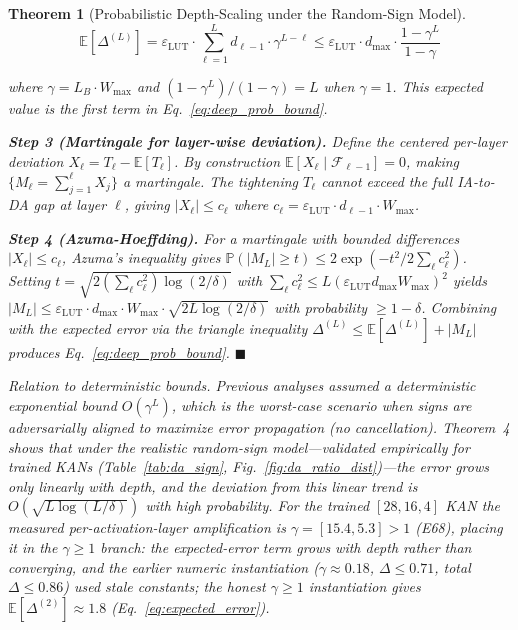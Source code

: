 \documentclass[journal,onecolumn]{IEEEtran}
\newtheorem{theorem}{Theorem}
\begin{document}
\begin{theorem}[Probabilistic Depth-Scaling under the Random-Sign Model]
\begin{equation}
\mathbb{E}[\Delta^{(L)}] = \varepsilon_{\text{LUT}} \cdot
\sum_{\ell=1}^L d_{\ell-1} \cdot \gamma^{L-\ell}
\leq \varepsilon_{\text{LUT}} \cdot d_{\max} \cdot
\frac{1 - \gamma^L}{1 - \gamma}
\label{eq:expected_error}
\end{equation}

where $\gamma = L_B \cdot W_{\max}$ and $(1-\gamma^L)/(1-\gamma) = L$
when $\gamma = 1$. This expected value is the first term in
Eq.~\ref{eq:deep_prob_bound}.

\vspace{2pt}
\noindent\textbf{Step 3 (Martingale for layer-wise deviation).}
Define the centered per-layer deviation
$X_\ell = T_\ell - \mathbb{E}[T_\ell]$. By construction
$\mathbb{E}[X_\ell \mid \mathcal{F}_{\ell-1}] = 0$, making
$\{M_\ell = \sum_{j=1}^\ell X_j\}$ a martingale. The tightening
$T_\ell$ cannot exceed the full IA-to-DA gap at layer $\ell$, giving
$|X_\ell| \leq c_\ell$ where
$c_\ell = \varepsilon_{\text{LUT}} \cdot d_{\ell-1} \cdot W_{\max}$.

\vspace{2pt}
\noindent\textbf{Step 4 (Azuma-Hoeffding).}
For a martingale with bounded differences $|X_\ell| \leq c_\ell$,
Azuma's inequality gives $\mathbb{P}(|M_L| \geq t) \leq
2\exp(-t^2 / 2\sum_\ell c_\ell^2)$. Setting
$t = \sqrt{2(\sum_\ell c_\ell^2) \log(2/\delta)}$ with
$\sum_\ell c_\ell^2 \leq L (\varepsilon_{\text{LUT}} d_{\max} W_{\max})^2$
yields $|M_L| \leq \varepsilon_{\text{LUT}} \cdot d_{\max} \cdot
W_{\max} \cdot \sqrt{2L \log(2/\delta)}$ with probability $\geq
1-\delta$. Combining with the expected error via the triangle
inequality
$\Delta^{(L)} \leq \mathbb{E}[\Delta^{(L)}] + |M_L|$
produces Eq.~\ref{eq:deep_prob_bound}. \hfill $\blacksquare$

\vspace{4pt}
\noindent\textit{Relation to deterministic bounds.}
Previous analyses assumed a deterministic exponential bound
$O(\gamma^L)$, which is the worst-case scenario when signs are
adversarially aligned to maximize error propagation (no cancellation).
Theorem~4 shows that under the realistic random-sign model---validated
empirically for trained KANs (Table~\ref{tab:da_sign},
Fig.~\ref{fig:da_ratio_dist})---the error grows only linearly with
depth, and the deviation from this linear trend is
$O(\sqrt{L \log(L/\delta)})$ with high probability. For the trained
$[28,16,4]$ KAN the measured per-activation-layer amplification is
$\gamma = [15.4, 5.3] > 1$ (E68), placing it in the $\gamma \geq 1$
branch: the expected-error term grows with depth rather than converging,
and the earlier numeric instantiation ($\gamma \approx 0.18$,
$\Delta \leq 0.71$, total $\Delta \leq 0.86$) used stale constants;
the honest $\gamma \geq 1$ instantiation gives
$\mathbb{E}[\Delta^{(2)}] \approx 1.8$ (Eq.~\ref{eq:expected_error}).


\end{theorem}
\end{document}
